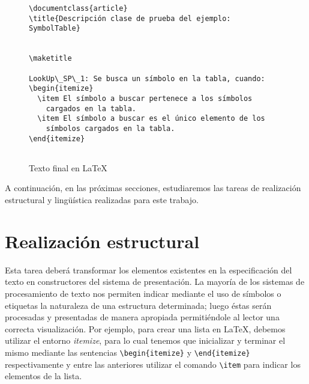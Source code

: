 \begin{figure}[H]
  \begin{verbatim}
\documentclass{article}
\title{Descripción clase de prueba del ejemplo: SymbolTable}


\maketitle

LookUp\_SP\_1: Se busca un símbolo en la tabla, cuando:
\begin{itemize}
  \item El símbolo a buscar pertenece a los símbolos
    cargados en la tabla.
  \item El símbolo a buscar es el único elemento de los
    símbolos cargados en la tabla.  
\end{itemize}


  \end{verbatim}
  \caption{Texto final en \LaTeX}
  \label{fig:ej_latex}
\end{figure}

A continuación, en las próximas secciones, estudiaremos las tareas de realización estructural y lingüística realizadas para este trabajo.

\section{Realización estructural}
\label{cap:structure_realization}


Esta tarea deberá transformar los elementos existentes en la especificación del texto en constructores del sistema de presentación. La mayoría de los sistemas de procesamiento de texto nos permiten indicar mediante el uso de símbolos o etiquetas la naturaleza de una estructura determinada; luego éstas serán procesadas y presentadas de manera apropiada permitiéndole al lector una correcta visualización. Por ejemplo, para crear una lista en \LaTeX, debemos utilizar el entorno \emph{itemize}, para lo cual tenemos que inicializar y terminar el mismo mediante las sentencias \verb|\begin{itemize}| y \verb|\end{itemize}| respectivamente y entre las anteriores utilizar el comando \verb|\item| para indicar los elementos de la lista.

